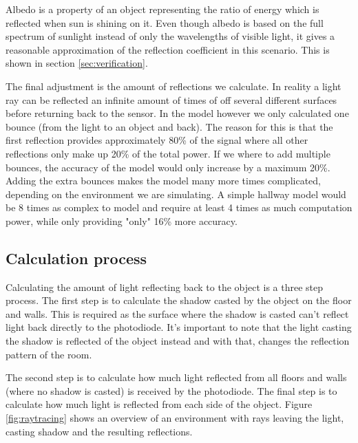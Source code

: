 Albedo is a property of an object representing the ratio of energy which is reflected when sun is shining on it. Even though albedo is based on the full spectrum of sunlight instead of only the wavelengths of visible light, it gives a reasonable approximation of the reflection coefficient in this scenario. This is shown in section \ref{sec:verification}.

The final adjustment is the amount of reflections we calculate. In reality a light ray can be reflected an infinite amount of times of off several different surfaces before returning back to the sensor. In the model however we only calculated one bounce (from the light to an object and back). The reason for this is that the first reflection provides approximately 80\% of the signal where all other reflections only make up 20\% of the total power\cite{indoor_VLC_no_LOS}. If we where to add multiple bounces, the accuracy of the model would only increase by a maximum 20\%. Adding the extra bounces makes the model many more times complicated, depending on the environment we are simulating. A simple hallway model would be 8 times as complex to model and require at least 4 times as much computation power, while only providing "only" 16\% more accuracy.

\subsection{Calculation process}
Calculating the amount of light reflecting back to the object is a three step process. The first step is to calculate the shadow casted by the object on the floor and walls. This is required as the surface where the shadow is casted can't reflect light back directly to the photodiode. It's important to note that the light casting the shadow is reflected of the object instead and with that, changes the reflection pattern of the room.

The second step is to calculate how much light reflected from all floors and walls (where no shadow is casted) is received by the photodiode. The final step is to calculate how much light is reflected from each side of the object. Figure \ref{fig:raytracing} shows an overview of an environment with rays leaving the light, casting shadow and the resulting reflections.

